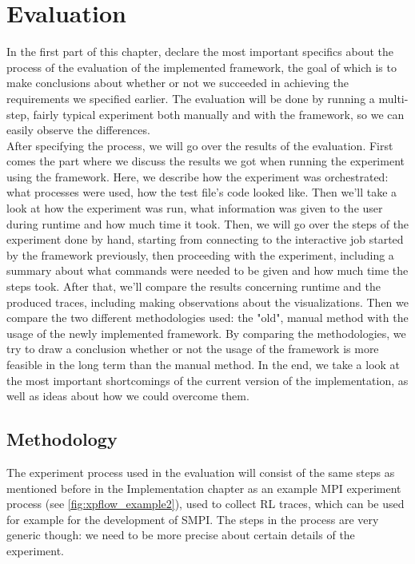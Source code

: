 



\chapter{Evaluation}
\label{Chapter5}

\label{sec:evaluation_plan}
In the first part of this chapter, declare the most important
specifics about the process of the evaluation of the
implemented framework, the goal of which is to make
conclusions about whether or not we succeeded in achieving the
requirements we specified earlier. The evaluation will be done by
running a multi-step, fairly typical experiment both manually and with
the framework, so we can easily observe the differences.\\
After specifying the process, we will go over the results of the
evaluation. First comes the part where we discuss the
results we got when running the experiment using the framework. Here,
we describe how the experiment was orchestrated: what processes were
used, how the test file's code looked like. Then we'll take a look at
how the experiment was run, what information was given to the user
during runtime and how much time it took. Then, we will go over the
steps of the experiment done by hand, starting from connecting to the
interactive job started by the framework previously, then proceeding
with the experiment, including a summary about what commands
were needed to be given and how much time the steps took. After that,
we'll compare the results concerning runtime and the produced traces,
including making observations about the visualizations. Then we
compare the two different methodologies used: the "old", manual method
with the usage of the newly implemented framework. By comparing the
methodologies, we try to draw a conclusion whether or not the usage of
the framework is more feasible in the long term than the manual
method. In the end, we take a look at the most important shortcomings
of the current version of the implementation, as well as ideas about
how we could overcome them.
\section{Methodology}
The experiment process used in the evaluation will consist of the same
steps as mentioned before in the Implementation chapter as an example
MPI experiment process (see \ref{fig:xpflow_example2}), used to collect
RL traces, which can be used for example for the development of
SMPI. The steps in the process are very generic though: we need to be
more precise about certain details of the experiment.
